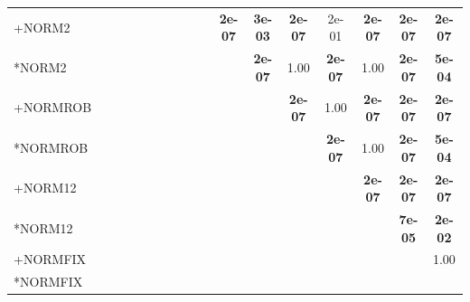 \begin{table}[t]
{\begin{tabular}{lcccccccccccccccc}
+NORM2 &  &  &  &  &  &  &  &  &  & \textbf{2e-07} & \textbf{3e-03} & \textbf{2e-07} & 2e-01 & \textbf{2e-07} & \textbf{2e-07} & \textbf{2e-07} \\
*NORM2 &  &  &  &  &  &  &  &  &  &  & \textbf{2e-07} & 1.00 & \textbf{2e-07} & 1.00 & \textbf{2e-07} & \textbf{5e-04} \\
+NORMROB &  &  &  &  &  &  &  &  &  &  &  & \textbf{2e-07} & 1.00 & \textbf{2e-07} & \textbf{2e-07} & \textbf{2e-07} \\
*NORMROB &  &  &  &  &  &  &  &  &  &  &  &  & \textbf{2e-07} & 1.00 & \textbf{2e-07} & \textbf{5e-04} \\
+NORM12 &  &  &  &  &  &  &  &  &  &  &  &  &  & \textbf{2e-07} & \textbf{2e-07} & \textbf{2e-07} \\
*NORM12 &  &  &  &  &  &  &  &  &  &  &  &  &  &  & \textbf{7e-05} & \textbf{2e-02} \\
+NORMFIX &  &  &  &  &  &  &  &  &  &  &  &  &  &  &  & 1.00 \\
*NORMFIX &  &  &  &  &  &  &  &  &  &  &  &  &  &  &  &  \\
\bottomrule
\end{tabular}
}
\end{table}

